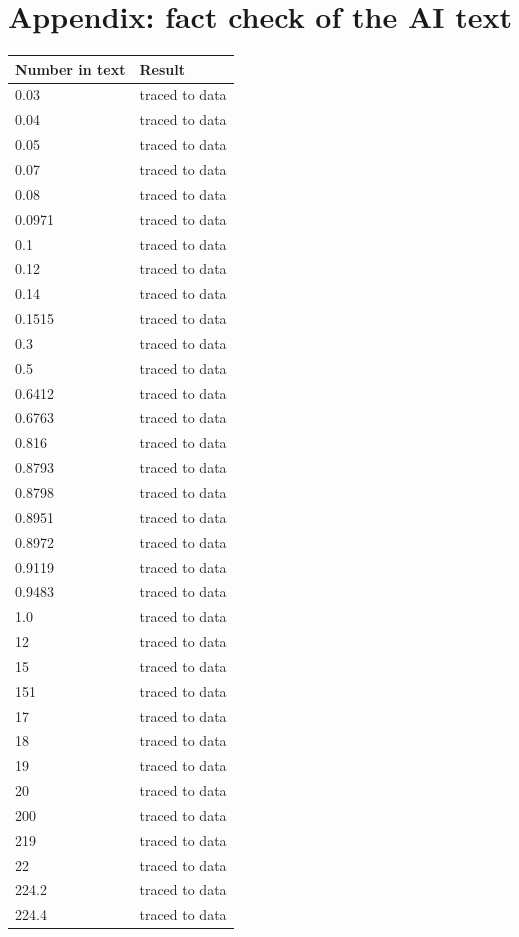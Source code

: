 \documentclass[10pt]{article}
\begin{document}
\section*{Appendix: fact check of the AI text}
{\small\begin{longtable}{p{4cm}p{5cm}}\toprule
\textbf{Number in text} & \textbf{Result} \\ \midrule \endhead
0.03 & traced to data \\
0.04 & traced to data \\
0.05 & traced to data \\
0.07 & traced to data \\
0.08 & traced to data \\
0.0971 & traced to data \\
0.1 & traced to data \\
0.12 & traced to data \\
0.14 & traced to data \\
0.1515 & traced to data \\
0.3 & traced to data \\
0.5 & traced to data \\
0.6412 & traced to data \\
0.6763 & traced to data \\
0.816 & traced to data \\
0.8793 & traced to data \\
0.8798 & traced to data \\
0.8951 & traced to data \\
0.8972 & traced to data \\
0.9119 & traced to data \\
0.9483 & traced to data \\
1.0 & traced to data \\
12 & traced to data \\
15 & traced to data \\
151 & traced to data \\
17 & traced to data \\
18 & traced to data \\
19 & traced to data \\
20 & traced to data \\
200 & traced to data \\
219 & traced to data \\
22 & traced to data \\
224.2 & traced to data \\
224.4 & traced to data \\

\end{longtable}}
\end{document}
